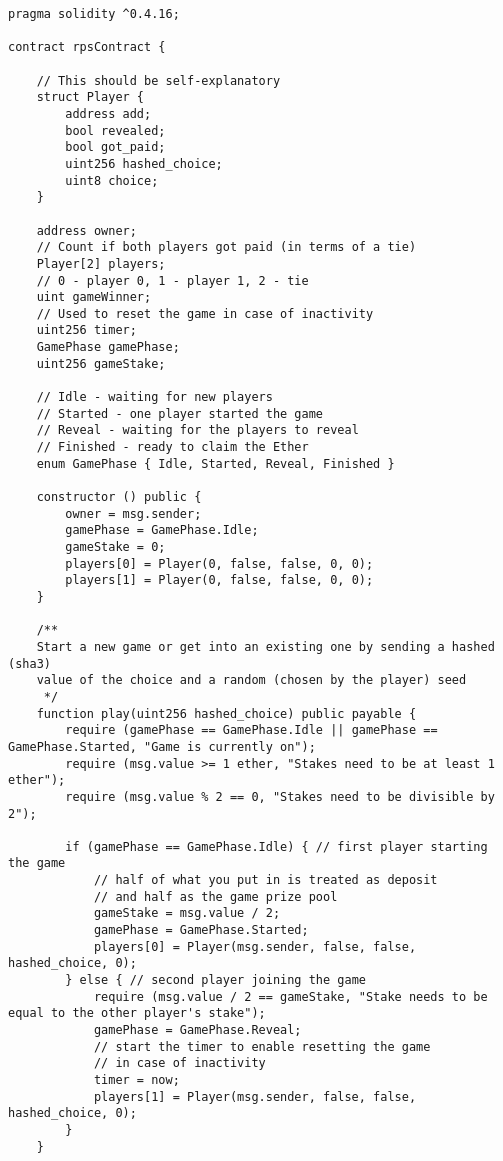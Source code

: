 \documentclass{article}
\begin{document}
    \begin{lstlisting}[language=Solidity]
pragma solidity ^0.4.16;

contract rpsContract {

    // This should be self-explanatory
    struct Player {
        address add;
        bool revealed;
        bool got_paid;
        uint256 hashed_choice;
        uint8 choice;
    }

    address owner;
    // Count if both players got paid (in terms of a tie)
    Player[2] players;
    // 0 - player 0, 1 - player 1, 2 - tie
    uint gameWinner;
    // Used to reset the game in case of inactivity
    uint256 timer;
    GamePhase gamePhase;
    uint256 gameStake;
    
    // Idle - waiting for new players
    // Started - one player started the game
    // Reveal - waiting for the players to reveal
    // Finished - ready to claim the Ether
    enum GamePhase { Idle, Started, Reveal, Finished }
    
    constructor () public {
        owner = msg.sender;
        gamePhase = GamePhase.Idle;
        gameStake = 0;
        players[0] = Player(0, false, false, 0, 0);
        players[1] = Player(0, false, false, 0, 0);
    }

    /**
    Start a new game or get into an existing one by sending a hashed (sha3)
    value of the choice and a random (chosen by the player) seed
     */
    function play(uint256 hashed_choice) public payable {
        require (gamePhase == GamePhase.Idle || gamePhase == GamePhase.Started, "Game is currently on");
        require (msg.value >= 1 ether, "Stakes need to be at least 1 ether");
        require (msg.value % 2 == 0, "Stakes need to be divisible by 2");

        if (gamePhase == GamePhase.Idle) { // first player starting the game
            // half of what you put in is treated as deposit
            // and half as the game prize pool
            gameStake = msg.value / 2;
            gamePhase = GamePhase.Started;
            players[0] = Player(msg.sender, false, false, hashed_choice, 0);
        } else { // second player joining the game
            require (msg.value / 2 == gameStake, "Stake needs to be equal to the other player's stake");
            gamePhase = GamePhase.Reveal;
            // start the timer to enable resetting the game
            // in case of inactivity
            timer = now;
            players[1] = Player(msg.sender, false, false, hashed_choice, 0);
        }
    }


\end{lstlisting}
\end{document}

